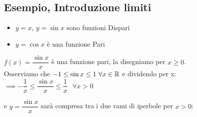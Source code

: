 \documentclass[../../main.tex]{subfiles}
\begin{document}
\subsection{Esempio, Introduzione limiti}
\begin{itemize}
    \item $y = x$, $y = \sin x$ sono funzioni Dispari
    \item $y = \cos x$ è una funzione Pari
\end{itemize}
$f(x) = \dfrac{\sin x}{x}$ è una funzione pari, la disegniamo per $x \geq 0$.\\
Osserviamo che $-1 \leq \sin x \leq 1 \ \forall x \in \R$ e dividendo per x: $\implies -\dfrac{1}{x} \leq \dfrac{\sin x}{x} \leq \dfrac{1}{x} \ \ \ \forall x > 0$\\
\begin{center}
\end{center}
e $y = \dfrac{\sin x}{x}$ sarà compresa tra i due rami di iperbole per $x > 0$:
\end{document}

